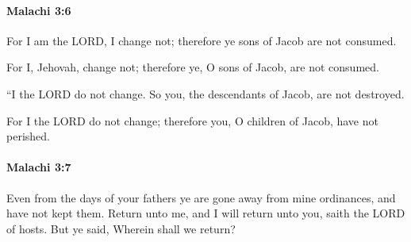 		\paragraph{Malachi 3:6} %
			\label{MALACHI-3-6}

			For I am the LORD, I change not; therefore ye sons of Jacob are not consumed.

			\begin{versebox}
					\item[BHS] 
					\item[LXX] 
					\item[ASV] For I, Jehovah, change not; therefore ye, O sons of Jacob, are not consumed.
					\item[NIV] “I the LORD do not change. So you, the descendants of Jacob, are not destroyed.
					\item[NRSV] For I the LORD do not change; therefore you, O children of Jacob, have not perished.
			\end{versebox}

		\paragraph{Malachi 3:7} %
			\label{MALACHI-3-7}

			Even from the days of your fathers ye are gone away from mine ordinances, and have not kept them. Return unto me, and I will return unto you, saith the LORD of hosts. But ye said, Wherein shall we return?

